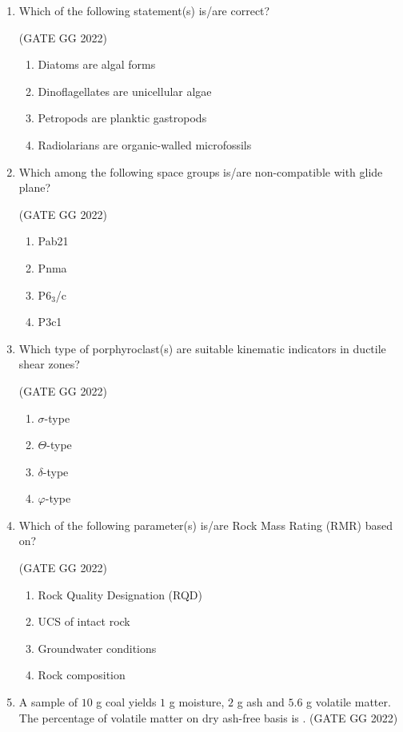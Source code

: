 \documentclass[journal]{IEEEtran}
\begin{document}
\begin{enumerate}[start=1]
\item Which of the following statement(s) is/are correct?  

\hfill(GATE GG 2022)
\begin{enumerate}
\item Diatoms are algal forms  
\item Dinoflagellates are unicellular algae  
\item Petropods are planktic gastropods  
\item Radiolarians are organic-walled microfossils  
\end{enumerate}

\item Which among the following space groups is/are non-compatible with glide plane?  

\hfill(GATE GG 2022)
\begin{enumerate}
\item Pab21  
\item Pnma  
\item P6$_3$/c  
\item P3c1  
\end{enumerate}

\item Which type of porphyroclast(s) are suitable kinematic indicators in ductile shear zones?  

\hfill(GATE GG 2022)
\begin{enumerate}
\item $\sigma$-type  
\item $\Theta$-type  
\item $\delta$-type  
\item $\varphi$-type  
\end{enumerate}

\item Which of the following parameter(s) is/are Rock Mass Rating (RMR) based on?

\hfill(GATE GG 2022)
\begin{enumerate}
\item Rock Quality Designation (RQD)  
\item UCS of intact rock  
\item Groundwater conditions  
\item Rock composition  
\end{enumerate}

\item A sample of $10$ g coal yields $1$ g moisture, $2$ g ash and $5.6$ g volatile matter.  The percentage of volatile matter on dry ash-free basis is \makebox[2cm]{\hrulefill}.  
\hfill(GATE GG 2022)
\vspace{0.5cm}


\end{enumerate}
\end{document}
